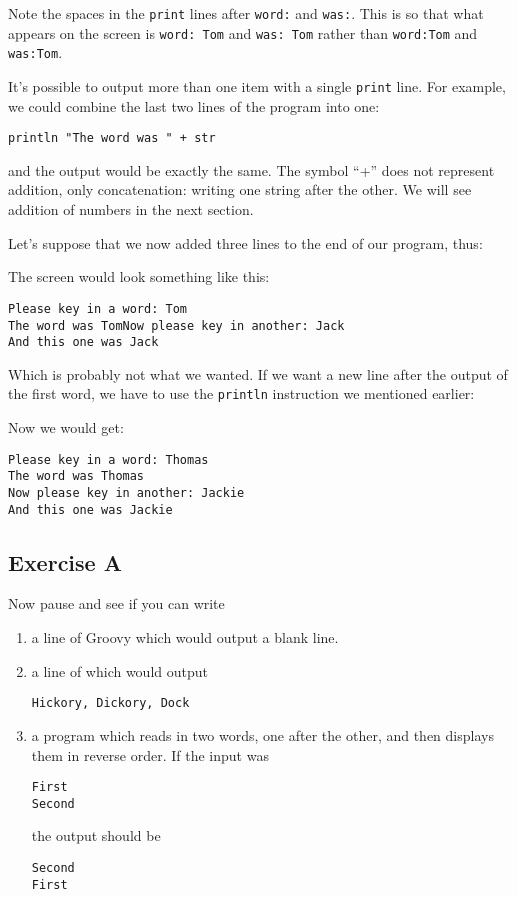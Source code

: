 Note the spaces in the \verb!print! lines after \verb!word:! and \verb!was:!.
This is so that what appears on the screen is \verb!word: Tom! and
\verb!was: Tom! rather than \verb!word:Tom! and \verb!was:Tom!.

It's possible to output more than one item with a single \verb!print! line.
For example, we could combine the last two lines of the program into one:

\begin{Verbatim}
println "The word was " + str
\end{Verbatim}

and the output would be exactly the same. The symbol ``+'' does not
represent addition, only concatenation: writing one string after the
other. We will see addition of numbers in the next section.

Let's suppose that we now added three lines to the end of our program, thus:


The screen would look something like this:
\begin{Verbatim}
Please key in a word: Tom
The word was TomNow please key in another: Jack
And this one was Jack
\end{Verbatim}

Which is probably not what we wanted.  If we want a new line after the
output of the first word, we have to use the \verb!println! instruction we mentioned earlier:


Now we would get:
\begin{Verbatim}
Please key in a word: Thomas
The word was Thomas
Now please key in another: Jackie
And this one was Jackie
\end{Verbatim}


\subsection*{Exercise A}

Now pause and see if you can write
\begin{enumerate}
\item
a line of Groovy which would output a blank line.
\item
a line of  which would output

\begin{Verbatim}
Hickory, Dickory, Dock
\end{Verbatim}

\item
a program which reads in two words, one after the other, and then displays them
in reverse order. If the input was 

\begin{Verbatim}
First
Second
\end{Verbatim}

the output should be

\begin{Verbatim}
Second
First
\end{Verbatim}

\end{enumerate}

